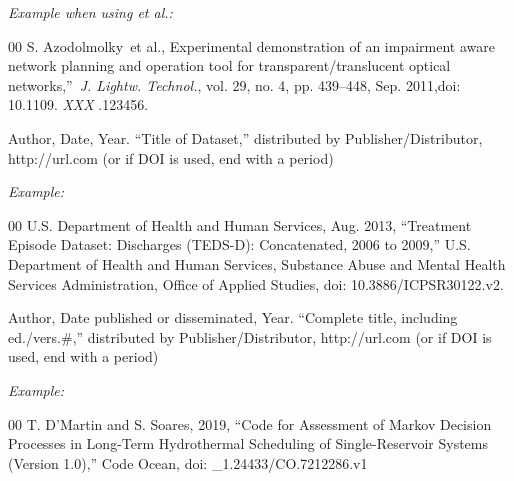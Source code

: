 \documentclass[journal,onecolumn,web]{ieeecolor}
\begin{document}
{\it Example when using \textit{et al.}:}{\vadjust{\vspace*{-2.5em}}}

\begin{thebibliography}{00}
 S. Azodolmolky~{{et al.}}, Experimental demonstration of an impairment aware network planning and operation tool for transparent/translucent optical networks,''~{\it J. Lightw. Technol.}, vol. 29, no. 4, pp. 439--448, Sep. 2011,doi:  {10.1109.} {{\it XXX}} {.123456}.
\end{thebibliography}


\noindent Author,  Date, Year. ``Title of Dataset,'' distributed by Publisher/Distributor, http://url.com (or if DOI is used, end with a period)

{\it Example:}{\vadjust{\vspace*{-2.5em}}}

\begin{thebibliography}{00}
 U.S. Department of Health and Human Services, Aug. 2013, ``Treatment Episode Dataset: Discharges (TEDS-D): Concatenated, 2006 to 2009,'' U.S. Department of Health and Human Services, Substance Abuse and Mental Health Services Administration, Office of Applied Studies, doi: 10.3886/ICPSR30122.v2.
\end{thebibliography}


\noindent Author,  Date published or disseminated, Year. ``Complete title, including ed./vers.\#,'' distributed by Publisher/Distributor, http://url.com (or if DOI is used, end with a period)

{\it Example:}{\vadjust{\vspace*{-2.5em}}}

\begin{thebibliography}{00}
 T. D'Martin and S. Soares, 2019, ``Code for Assessment of Markov Decision Processes in Long-Term Hydrothermal Scheduling of Single-Reservoir Systems (Version 1.0),'' Code Ocean, doi: \_1.24433/CO.7212286.v1
\end{thebibliography}
\end{document}
